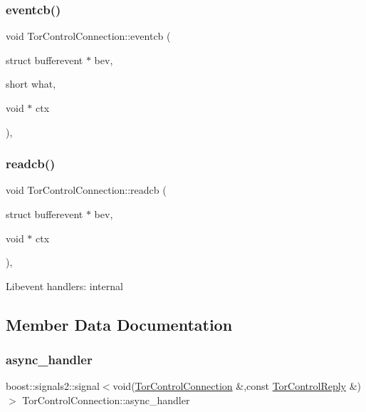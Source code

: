 \subsubsection{\texorpdfstring{eventcb()}{eventcb()}}
{\footnotesize\ttfamily void Tor\+Control\+Connection\+::eventcb (\begin{DoxyParamCaption}\item[{struct bufferevent $\ast$}]{bev,  }\item[{short}]{what,  }\item[{void $\ast$}]{ctx }\end{DoxyParamCaption})\hspace{0.3cm}{\ttfamily [static]}, {\ttfamily [private]}}

\mbox{\label{class_tor_control_connection_a7d7e2393f19cb41c32223def3df769ea}} 
\subsubsection{\texorpdfstring{readcb()}{readcb()}}
{\footnotesize\ttfamily void Tor\+Control\+Connection\+::readcb (\begin{DoxyParamCaption}\item[{struct bufferevent $\ast$}]{bev,  }\item[{void $\ast$}]{ctx }\end{DoxyParamCaption})\hspace{0.3cm}{\ttfamily [static]}, {\ttfamily [private]}}

Libevent handlers\+: internal 

\subsection{Member Data Documentation}
\mbox{\label{class_tor_control_connection_a23c206776020bd925c2da41e840cc08a}} 
\subsubsection{\texorpdfstring{async\+\_\+handler}{async\_handler}}
{\footnotesize\ttfamily boost\+::signals2\+::signal$<$void(\mbox{\hyperlink{class_tor_control_connection}{Tor\+Control\+Connection}} \&,const \mbox{\hyperlink{class_tor_control_reply}{Tor\+Control\+Reply}} \&)$>$ Tor\+Control\+Connection\+::async\+\_\+handler}

